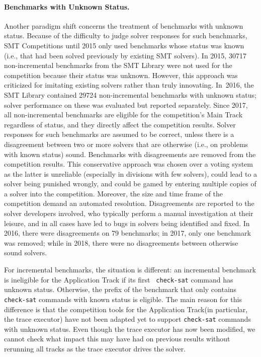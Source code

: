 \documentclass[dvipsnames,table,twoside,11pt]{article}
\newcommand{\maintrack}{Main Track\xspace}
\newcommand{\apptrack}{Application Track\xspace}
\begin{document}
\paragraph{Benchmarks with Unknown Status.}
Another paradigm shift concerns the treatment of benchmarks with
unknown status.  Because of the difficulty to judge solver responses
for such benchmarks, SMT Competitions until 2015 only used benchmarks
whose status was known (i.e., that had been solved previously by
existing SMT solvers).  In 2015, \num{30717} non-incremental benchmarks
from the SMT Library were not used for the competition because their
status was unknown.  However, this approach was criticized for
imitating existing solvers rather than truly innovating.  In~2016,
the SMT Library contained \num{29724} non-incremental benchmarks with
unknown status; solver performance on these was evaluated but reported
separately.  Since 2017, all non-incremental benchmarks are eligible
for the competition's \maintrack regardless of status, and they
directly affect the competition results.  Solver responses for such
benchmarks are assumed to be correct, unless there is a disagreement
between two or more solvers that are otherwise (i.e., on problems with
known status) sound.  Benchmarks with disagreements are removed from
the competition results.  This conservative approach was chosen over a
voting system as the latter is unreliable (especially in divisions
with few solvers), could lead to a solver being punished wrongly, and
could be gamed by entering multiple copies of a solver into the
competition.  Moreover, the size and time frame of the competition
demand an automated resolution.  Disagreements are reported to the
solver developers involved, who typically perform a manual
investigation at their leisure, and in all cases have led to bugs in
solvers being identified and fixed.  In 2016, there were disagreements
on 79 benchmarks; in 2017, only one benchmark was removed; while in
2018, there were no disagreements between otherwise sound solvers.

For incremental benchmarks, the situation is different: an incremental
benchmark is ineligible for the \apptrack if its first {\tt
  check-sat} command has unknown status.  Otherwise, the prefix of the
benchmark that only contains {\tt check-sat} commands with known
status is eligible.  The main reason for this difference is that the
competition tools for the \apptrack (in particular, the trace
executor) have not been adapted yet to support {\tt check-sat}
commands with unknown status. Even though the trace executor has now been modified, we cannot check what impact this may have had on previous results without rerunning all tracks as the trace executor drives the solver.
\end{document}

